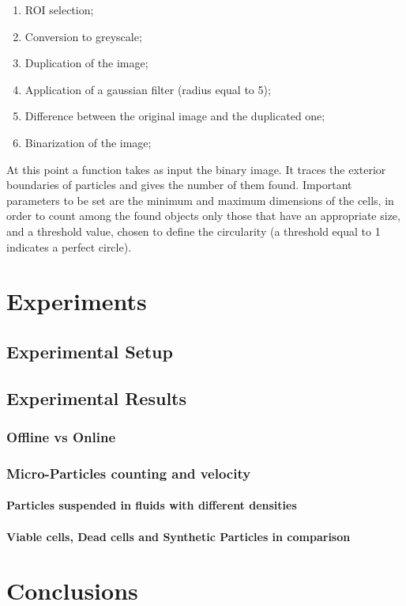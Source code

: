 \documentclass[journal]{IEEEtran}
\theoremstyle{definition}
\theoremstyle{remark}
\begin{document}
 \begin{enumerate}
 	\item ROI selection;
 	\item Conversion to greyscale;
 	\item Duplication of the image;
 	\item Application of a gaussian filter (radius equal to 5);
 	\item Difference between the original image and the duplicated one;
 	\item Binarization of the image;
 \end{enumerate}
At this point a function takes as input the binary image. It traces the exterior boundaries of particles and gives the number of them found.
Important parameters to be set are the minimum and maximum dimensions of the cells, in order to count among the found objects only those that have an appropriate size, and a threshold value, chosen to define the circularity (a threshold equal to 1 indicates a perfect circle).



\section{Experiments}

\subsection{Experimental Setup}

\subsection{Experimental Results}

\subsubsection{Offline vs Online}

\subsubsection{Micro-Particles counting and velocity}

\paragraph{Particles suspended in fluids with different densities}

\paragraph{Viable cells, Dead cells and Synthetic Particles in comparison}

\section{Conclusions}


%
%
\end{document}
